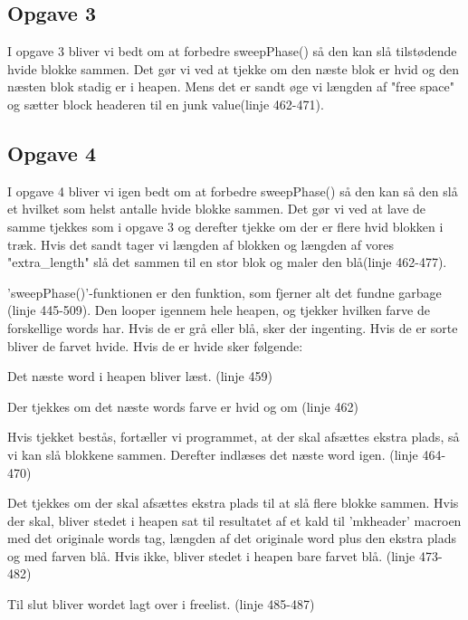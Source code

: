 \subsection{Opgave 3}
\label{O2_3}
I opgave 3 bliver vi bedt om at forbedre sweepPhase() så den kan slå tilstødende hvide blokke sammen. Det gør vi ved at tjekke om den næste blok er hvid og den næsten blok stadig er i heapen. Mens det er sandt øge vi længden af "free space"  og sætter block headeren til en junk value(linje 462-471).
 
\subsection{Opgave 4}
\label{O2_4}
I opgave 4 bliver vi igen bedt om at forbedre sweepPhase() så den kan så den slå et hvilket som helst antalle hvide blokke sammen. Det gør vi ved at lave de samme tjekkes som i opgave 3 og derefter tjekke om der er flere hvid blokken i træk. Hvis det
sandt tager vi længden af blokken og længden af vores "extra_length" slå det sammen til en stor blok og maler den blå(linje 462-477).







'sweepPhase()'-funktionen er den funktion, som fjerner alt det fundne garbage (linje 445-509). Den looper igennem hele heapen, og tjekker hvilken farve de forskellige words har. Hvis de er grå eller blå, sker der ingenting. Hvis de er sorte bliver de farvet hvide. Hvis de er hvide sker følgende:
\begin{my_enumerate}
	\item Det næste word i heapen bliver læst. (linje 459)
	\item Der tjekkes om det næste words farve er hvid og om (linje 462) %
	\item Hvis tjekket bestås, fortæller vi programmet, at der skal afsættes ekstra plads, så vi kan slå blokkene sammen. Derefter indlæses det næste word igen. (linje 464-470)
	\item Det tjekkes om der skal afsættes ekstra plads til at slå flere blokke sammen. Hvis der skal, bliver stedet i heapen sat til resultatet af et kald til 'mkheader' macroen med det originale words tag, længden af det originale word plus den ekstra plads og med farven blå. Hvis ikke, bliver stedet i heapen bare farvet blå. (linje 473-482)
	\item Til slut bliver wordet lagt over i freelist. (linje 485-487)
\end{my_enumerate}

